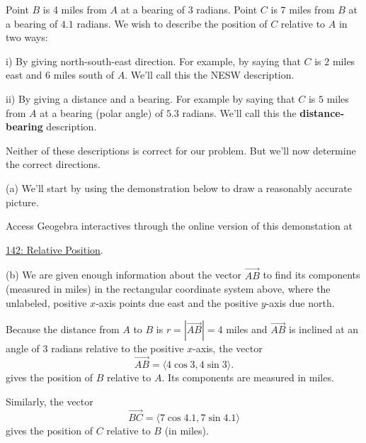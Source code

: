 \documentclass{ximera}
\begin{document}
\begin{example}  \label{Edsa5454v:Vectors}
Point $B$ is 4 miles from $A$ at a bearing of $3$ radians. Point $C$ is $7$ miles from $B$ at a bearing of $4.1$ radians. We wish to describe the position of $C$ relative to $A$ in two ways:

i) By giving north-south-east direction. For example, by saying that $C$ is $2$ miles east and $6$ miles south of $A$. We'll call this the NESW description.

ii) By giving a distance and a bearing. For example by saying that $C$ is $5$ miles from $A$ at a bearing (polar angle) of $5.3$ radians. We'll call this the {\bf distance-bearing} description.

Neither of these descriptions is correct for our problem. But we'll now determine the correct directions.

\begin{explanation}

(a) We'll start by using the demonstration below to draw a reasonably accurate picture. %


Access Geogebra interactives through the online version of this demonstation at
 
\href{https://www.geogebra.org/classic/bhdsgxtx}{142: Relative Position}.

 
\begin{onlineOnly}
    \begin{center}
\end{center}
\end{onlineOnly}


(b) We are given enough information about the vector $\overrightarrow{AB}$ to find its components (measured in miles) in the rectangular coordinate system above, where the unlabeled, positive $x$-axis points due east and the positive $y$-axis due north.

Because the distance from $A$ to $B$ is $r=  |\overrightarrow{AB}| = 4$ miles and $\overrightarrow{AB}$ is inclined at an angle of $3$ radians relative to the positive $x$-axis, the vector
\[
       \overrightarrow{AB} = \langle 4 \cos 3, 4 \sin 3\rangle .
\]
gives the position of $B$ relative to $A$. Its components are measured in miles.

Similarly, the vector
\[
   \overrightarrow{BC} = \langle 7 \cos 4.1, 7 \sin 4.1\rangle
\]
gives the position of $C$ relative to $B$ (in miles).


\end{explanation}
\end{example}
\end{document}
